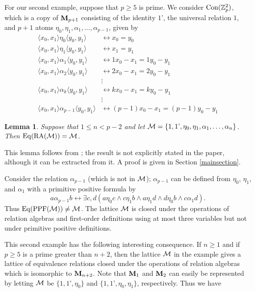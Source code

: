 \documentclass[12pt]{au}
\newtheorem{lm}[thm]{Lemma}
\begin{document}
For our second example, suppose that $p\geq5$ is prime.
We consider ${{\rm Con}}(\mathbb{Z}^2_p)$, which is a copy of ${{\mathbf{\uppercase{M}}}}_{p+1}$ consisting of
the identity ${{1\textrm{'}}}$, the universal relation $1$, and  $p+1$
atoms $\eta_0,\eta_1,\alpha_1,\ldots,\alpha_{p-1}$, given by
\begin{align*}
  \langle x_0,x_1\rangle\eta_0\langle y_0,y_1\rangle &\leftrightarrow x_0=y_0\\
  \langle x_0,x_1\rangle\eta_1\langle y_0,y_1\rangle &\leftrightarrow x_1=y_1\\
  \langle x_0,x_1\rangle\alpha_1 \langle y_0,y_1\rangle &\leftrightarrow 1 x_0-x_1=1 y_0-y_1\\
  \langle x_0,x_1\rangle\alpha_2\langle y_0,y_1\rangle &\leftrightarrow
  2x_0-x_1=2y_0-y_1 \\
  &\vdots\\
  \langle x_0,x_1\rangle\alpha_k\langle y_0,y_1\rangle &\leftrightarrow
  kx_0-x_1=ky_0-y_1\\
&\vdots\\
  \langle x_0,x_1\rangle\alpha_{p-1}\langle y_0,y_1\rangle &\leftrightarrow (p-1)x_0-x_1=(p-1)y_0-y_1
\end{align*}

\begin{lm}\label{lemma1}
 Suppose that $1\leq n <p-2$ and let ${{\mathcal{\uppercase {M}}}}=\{1, {{1\textrm{'}}}, \eta_0, \eta_1, \alpha_1, \ldots, \alpha_n\}$.
Then   ${{\rm Eq}}({{\rm RA}}({{\mathcal{\uppercase {M}}}})) = {{\mathcal{\uppercase {M}}}}$.
\end{lm}

This lemma follows from \cite{Lyndon};  the result is not explicitly stated in the paper, although it can be extracted from it. A proof is given in Section \ref{mainsection}.

  Consider the relation $\alpha_{p-1}$ (which is not in ${{\mathcal{\uppercase {M}}}}$); $\alpha_{p-1}$  can be defined from $\eta_0$, $\eta_1$, and $\alpha_1$ with  a primitive positive formula by
$$a \alpha_{p-1} b \leftrightarrow \exists c, d \left( a \eta_0 c \wedge c \eta_1 b \wedge a \eta_1 d \wedge d \eta_0 b \wedge c \alpha_1 d
\right).$$
Thus ${{\rm Eq}}({{\rm PPF}}({{\mathcal{\uppercase {M}}}})) \neq {{\mathcal{\uppercase {M}}}}$.  The lattice ${{\mathcal{\uppercase {m}}}}$ is closed under
the operations of relation algebras and first-order definitions
using at most three variables but not under primitive positive
definitions.

This second example has the following interesting consequence.  If $n\geq 1$ and if $p\geq5$ is a prime greater than $n+2$, then the lattice ${{\mathcal{\uppercase {M}}}}$ in the example gives a lattice of equivalence relations closed under the operations of relation algebras which is isomorphic to ${{\mathbf{\uppercase{m}}}}_{n+2}$. Note that ${{\mathbf{\uppercase{M}}}}_1$ and ${{\mathbf{\uppercase{M}}}}_2$ can easily be represented by letting ${{\mathcal{\uppercase {M}}}}$ be $\{1, {{1\textrm{'}}}, \eta_0 \}$ and $\{1, {{1\textrm{'}}}, \eta_0, \eta_1 \}$, respectively.  Thus we have
\end{document}
